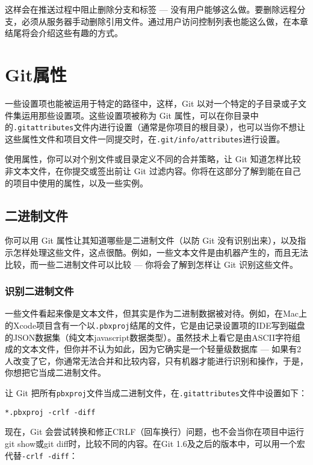 \documentclass[a4paper]{book}
\begin{document}
这样会在推送过程中阻止删除分支和标签 --- 没有用户能够这么做。要删除远程分支，必须从服务器手动删除引用文件。通过用户访问控制列表也能这么做，在本章结尾将会介绍这些有趣的方式。

\section{Git属性}

一些设置项也能被运用于特定的路径中，这样，Git 以对一个特定的子目录或子文件集运用那些设置项。这些设置项被称为 Git 属性，可以在你目录中的\texttt{.gitattributes}文件内进行设置（通常是你项目的根目录），也可以当你不想让这些属性文件和项目文件一同提交时，在\texttt{.git/info/attributes}进行设置。

使用属性，你可以对个别文件或目录定义不同的合并策略，让 Git 知道怎样比较非文本文件，在你提交或签出前让 Git 过滤内容。你将在这部分了解到能在自己的项目中使用的属性，以及一些实例。

\subsection{二进制文件}

你可以用 Git 属性让其知道哪些是二进制文件（以防 Git 没有识别出来），以及指示怎样处理这些文件，这点很酷。例如，一些文本文件是由机器产生的，而且无法比较，而一些二进制文件可以比较 --- 你将会了解到怎样让 Git 识别这些文件。

\subsubsection{识别二进制文件}

一些文件看起来像是文本文件，但其实是作为二进制数据被对待。例如，在Mac上的Xcode项目含有一个以\texttt{.pbxproj}结尾的文件，它是由记录设置项的IDE写到磁盘的JSON数据集（纯文本javascript数据类型）。虽然技术上看它是由ASCII字符组成的文本文件，但你并不认为如此，因为它确实是一个轻量级数据库 --- 如果有2人改变了它，你通常无法合并和比较内容，只有机器才能进行识别和操作，于是，你想把它当成二进制文件。

让 Git 把所有\texttt{pbxproj}文件当成二进制文件，在\texttt{.gitattributes}文件中设置如下：

\begin{shaded}\begin{verbatim}
*.pbxproj -crlf -diff
\end{verbatim}\end{shaded}

现在，Git 会尝试转换和修正CRLF（回车换行）问题，也不会当你在项目中运行git show或git diff时，比较不同的内容。在Git 1.6及之后的版本中，可以用一个宏代替\texttt{-crlf -diff}：
\end{document}
